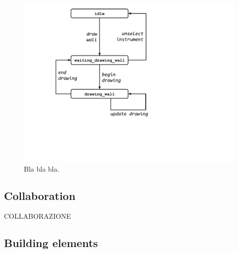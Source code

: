 \begin{figure}[!t]
\centering
\includegraphics[width=\linewidth]{contents/images/uc_draw_wall}

\caption{Bla bla bla.}
\label{fig_sim}
\end{figure}




\subsection{Collaboration}
    COLLABORAZIONE\\

\subsection{Building elements}

